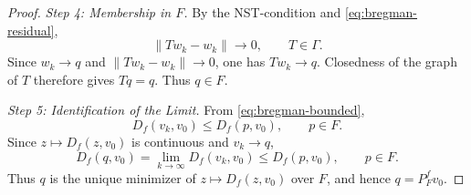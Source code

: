 \documentclass[10pt,a4paper]{amsart}
\begin{document}
\begin{proof}
\smallskip
\noindent\emph{Step 4: Membership in $F$.}
By the NST-condition and \eqref{eq:bregman-residual},
\[
 \|Tw_k-w_k\|\to0,
 \qquad T\in\Gamma.
\]
Since $w_k\to q$ and $\|Tw_k-w_k\|\to0$, one has $Tw_k\to q$. Closedness of the graph of $T$ therefore gives $Tq=q$. Thus $q\in F$.

\smallskip
\noindent\emph{Step 5: Identification of the Limit.}
From \eqref{eq:bregman-bounded},
\[
 D_f(v_k,v_0)\leq D_f(p,v_0),
 \qquad p\in F.
\]
Since $z\mapsto D_f(z,v_0)$ is continuous and $v_k\to q$,
\[
 D_f(q,v_0)=\lim_{k\to\infty}D_f(v_k,v_0)\leq D_f(p,v_0),\qquad p\in F.
\]
Thus $q$ is the unique minimizer of $z\mapsto D_f(z,v_0)$ over $F$, and hence $q=P_F^fv_0$.
\end{proof}
\end{document}
